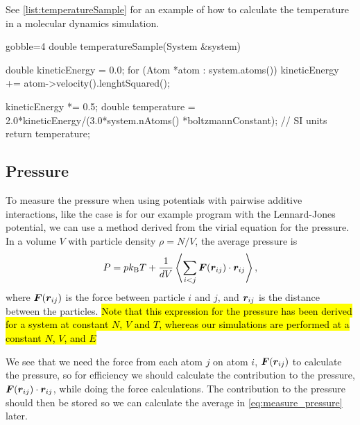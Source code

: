 See \cref{list:temperatureSample} for an example of how to calculate the temperature in a molecular dynamics simulation.
%
\begin{listing}[!htb]%
\begin{cppcode*}{gobble=4}
    double temperatureSample(System &system)
    {
        double kineticEnergy = 0.0;
        for (Atom *atom : system.atoms())
        {
            kineticEnergy += atom->velocity().lenghtSquared();
        }

        kineticEnergy *= 0.5;
        double temperature = 2.0*kineticEnergy/(3.0*system.nAtoms()
                                                *boltzmannConstant);  // SI units
        return temperature;
    }
\end{cppcode*}%
\caption{%
    An example of how to calculate the temperature in a molecular dynamics simulation. Example implementation of \texttt{temperatureSample} from \cref{list:sampling}.%
    \label{list:temperatureSample}%
}%
\end{listing}%


\subsection{Pressure\label{subsec:pressure}}
To measure the pressure when using potentials with pairwise additive interactions, like the case is for our example program with the Lennard-Jones potential, we can use a method derived from the virial equation for the pressure\cite[Section~4.4]{frenkel2001understanding}. In a volume $V$ with particle density $\rho = N/V$, the average pressure is
\begin{align}
    P = pk_\text{B}T + \frac{1}{dV} \Braket{\sum_{i<j} \boldsymbol{F} (\boldsymbol{r}_{ij}) \cdot \boldsymbol{r}_{ij}},
    \label{eq:measure_pressure}
\end{align}
where $\boldsymbol{F}(\boldsymbol{r}_{ij})$ is the force between particle $i$ and $j$, and $\boldsymbol{r}_{ij}$ is the distance between the particles. \hl{Note that this expression for the pressure has been derived for a system at constant $N$, $V$ and $T$, whereas our simulations are performed at a constant $N$, $V$, and $E$}

We see that we need the force from each atom $j$ on atom $i$, $\boldsymbol{F}(\boldsymbol{r}_{ij})$ to calculate the pressure, so for efficiency we should calculate the contribution to the pressure, $\boldsymbol{F}(\boldsymbol{r}_{ij})\cdot\boldsymbol{r}_{ij}$, while doing the force calculations. The contribution to the pressure should then be stored so we can calculate the average in \cref{eq:measure_pressure} later.

